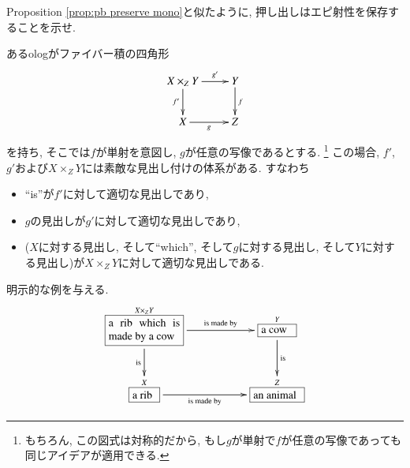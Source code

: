 \begin{exercise}
Proposition \ref{prop:pb preserve mono}と似たように, 押し出しはエピ射性を保存することを示せ.
\end{exercise}

\begin{example}\label{exc:olog pullbacks}


あるologがファイバー積の四角形
$$\xymatrix{X\times_ZY\ar[r]^-{g'}\ar[d]_{f'}&Y\ar[d]^f\\X\ar[r]_g&Z}$$を持ち, そこでは$f$が単射を意図し, $g$が任意の写像であるとする.
\footnote{もちろん, この図式は対称的だから, もし$g$が単射で$f$が任意の写像であっても同じアイデアが適用できる.}
この場合, $f'$, $g'$および$X\times_ZY$には素敵な見出し付けの体系がある. すなわち
\begin{itemize}
\item ``is''が$f'$に対して適切な見出しであり, 
\item $g$の見出しが$g'$に対して適切な見出しであり,
\item ($X$に対する見出し, そして``which'', そして$g$に対する見出し, そして$Y$に対する見出し)が$X\times_ZY$に対して適切な見出しである.
\end{itemize}

明示的な例を与える.
$$\xymatrix{
\obox{X\times_ZY}{.9in}{a rib which is made by a cow}\LA{rr}{is made by}\LAL{d}{is}&&\obox{Y}{.4in}{a cow}\LA{d}{is}\\
\obox{X}{.3in}{a rib}\LAL{rr}{is made by}&&\obox{Z}{.6in}{an animal}
}
$$

\end{example}

